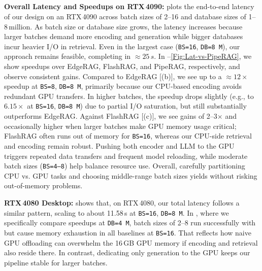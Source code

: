 \subsection{}
\label{subsec:eval4090}
\noindent\textbf{Overall Latency and Speedups on RTX\,4090:}
 plots the end-to-end latency of our design on an \mbox{RTX\,4090} across batch sizes of 2--16 and database sizes of 1--8\,million. As batch size or database size grows, the latency increases because larger batches demand more encoding and generation while bigger databases incur heavier I/O in retrieval. Even in the largest case (\texttt{BS=16}, \texttt{DB=8\,M}), our approach remains feasible, completing in  \emph{$\approx25\,s$}. In --\ref{Fig:Lat-vs-PipeRAG}, we show speedups over EdgeRAG, FlashRAG, and PipeRAG, respectively, and observe consistent gains. Compared to EdgeRAG [(b)], we see up to a $\approx12\times$ speedup at \texttt{BS=8}, \texttt{DB=8\,M}, primarily because our CPU-based encoding avoids redundant GPU transfers. In higher batches, the speedup drops slightly (e.g., to $6.15\times$ at \texttt{BS=16}, \texttt{DB=8\,M}) due to partial I/O saturation, but still substantially outperforms EdgeRAG. Against FlashRAG [(c)], we see gains of 2--3$\times$ and occasionally higher when larger batches make GPU memory usage critical; FlashRAG often runs out of memory for \texttt{BS=16}, whereas our CPU-side retrieval and encoding remain robust. Pushing both encoder and LLM to the GPU triggers repeated data transfers and frequent model reloading, while moderate batch sizes (\texttt{BS=4--8}) help balance resource use. Overall, carefully partitioning CPU vs. GPU tasks and choosing middle-range batch sizes yields  without risking out-of-memory problems.

\noindent\textbf{\mbox{RTX\,4080} Desktop:}
 shows that, on \mbox{RTX\,4080}, our total latency follows a similar pattern, scaling to about 11.58\,s at \texttt{BS=16}, \texttt{DB=8\,M}. In , where we specifically compare speedups at \texttt{DB=4\,M}, batch sizes of 2--8 run successfully with \design{} but cause memory exhaustion in all baselines at \texttt{BS=16}. That reflects how naive GPU offloading can overwhelm the 16\,GB GPU memory if encoding and retrieval also reside there. 
In contrast, dedicating only generation to the GPU keeps our pipeline stable for larger batches. 

